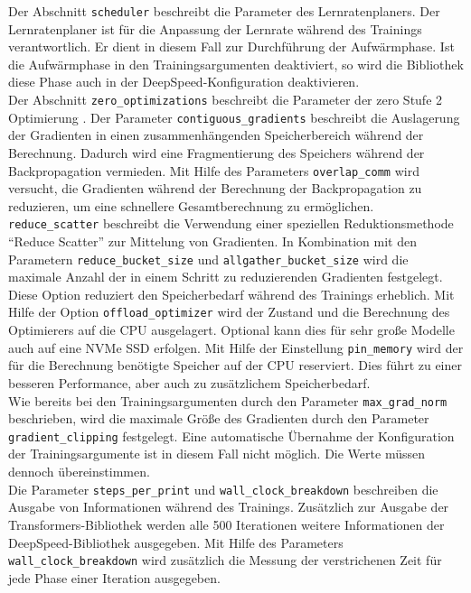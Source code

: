 Der Abschnitt \texttt{scheduler} beschreibt die Parameter des Lernratenplaners. Der Lernratenplaner ist für die Anpassung der Lernrate während des Trainings verantwortlich.
Er dient in diesem Fall zur Durchführung der Aufwärmphase. Ist die Aufwärmphase in den Trainingsargumenten deaktiviert, so wird die Bibliothek diese Phase auch in der DeepSpeed-Konfiguration deaktivieren.\\

Der Abschnitt \texttt{zero\_optimizations} beschreibt die Parameter der \ac{zero} Stufe 2 Optimierung \citep{deepspeed}.
Der Parameter \texttt{contiguous\_gradients} beschreibt die Auslagerung der Gradienten in einen zusammenhängenden Speicherbereich während der Berechnung.
Dadurch wird eine Fragmentierung des Speichers während der Backpropagation vermieden.
Mit Hilfe des Parameters \texttt{overlap\_comm} wird versucht, die Gradienten während der Berechnung der Backpropagation zu reduzieren, um eine schnellere Gesamtberechnung zu ermöglichen.
\texttt{reduce\_scatter} beschreibt die Verwendung einer speziellen Reduktionsmethode \enquote{Reduce Scatter} zur Mittelung von Gradienten.
In Kombination mit den Parametern \texttt{reduce\_bucket\_size} und \texttt{allgather\_bucket\_size} wird die maximale Anzahl der in einem Schritt zu reduzierenden Gradienten festgelegt.
Diese Option reduziert den Speicherbedarf während des Trainings erheblich.
Mit Hilfe der Option \texttt{offload\_optimizer} wird der Zustand und die Berechnung des Optimierers auf die CPU ausgelagert.
Optional kann dies für sehr große Modelle auch auf eine NVMe SSD erfolgen.
Mit Hilfe der Einstellung \texttt{pin\_memory} wird der für die Berechnung benötigte Speicher auf der CPU reserviert.
Dies führt zu einer besseren Performance, aber auch zu zusätzlichem Speicherbedarf.\\

Wie bereits bei den Trainingsargumenten durch den Parameter \texttt{max\_grad\_norm} beschrieben, wird die maximale Größe des Gradienten durch den Parameter \texttt{gradient\_clipping} festgelegt.
Eine automatische Übernahme der Konfiguration der Trainingsargumente ist in diesem Fall nicht möglich.
Die Werte müssen dennoch übereinstimmen.\\

Die Parameter \texttt{steps\_per\_print} und \texttt{wall\_clock\_breakdown} beschreiben die Ausgabe von Informationen während des Trainings.
Zusätzlich zur Ausgabe der Transformers-Bibliothek werden alle 500 Iterationen weitere Informationen der DeepSpeed-Bibliothek ausgegeben.
Mit Hilfe des Parameters \texttt{wall\_clock\_breakdown} wird zusätzlich die Messung der verstrichenen Zeit für jede Phase einer Iteration ausgegeben.\\

